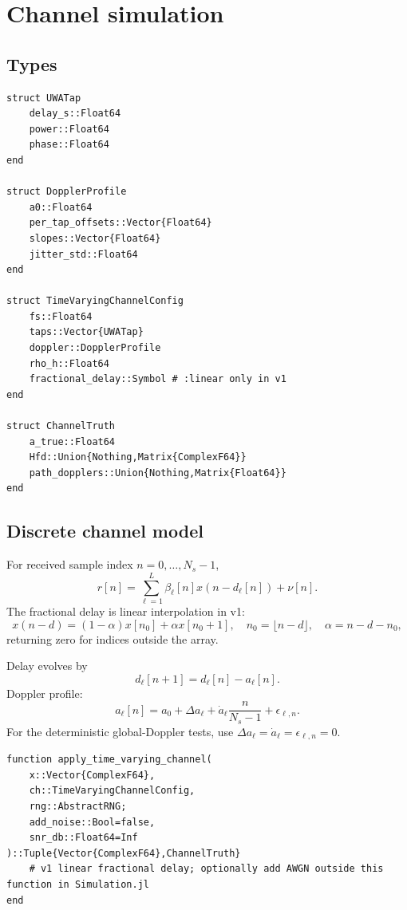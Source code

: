 \documentclass[11pt]{article}
\begin{document}
\clearpage
\section{Channel simulation}

\subsection{Types}

\begin{lstlisting}
struct UWATap
    delay_s::Float64
    power::Float64
    phase::Float64
end

struct DopplerProfile
    a0::Float64
    per_tap_offsets::Vector{Float64}
    slopes::Vector{Float64}
    jitter_std::Float64
end

struct TimeVaryingChannelConfig
    fs::Float64
    taps::Vector{UWATap}
    doppler::DopplerProfile
    rho_h::Float64
    fractional_delay::Symbol # :linear only in v1
end

struct ChannelTruth
    a_true::Float64
    Hfd::Union{Nothing,Matrix{ComplexF64}}
    path_dopplers::Union{Nothing,Matrix{Float64}}
end
\end{lstlisting}

\subsection{Discrete channel model}

For received sample index $n=0,\ldots,N_s-1$,
\begin{equation}
r[n]=\sum_{\ell=1}^{L}\beta_\ell[n]x(n-d_\ell[n])+\nu[n].
\end{equation}
The fractional delay is linear interpolation in v1:
\begin{equation}
x(n-d)=(1-\alpha)x[n_0]+\alpha x[n_0+1],\quad n_0=\lfloor n-d\rfloor,
\quad \alpha=n-d-n_0,
\end{equation}
returning zero for indices outside the array.

Delay evolves by
\begin{equation}
d_\ell[n+1]=d_\ell[n]-a_\ell[n].
\end{equation}
Doppler profile:
\begin{equation}
a_\ell[n]=a_0+\Delta a_\ell+\dot a_\ell\frac{n}{N_s-1}+\epsilon_{\ell,n}.
\end{equation}
For the deterministic global-Doppler tests, use $\Delta a_\ell=\dot a_\ell=\epsilon_{\ell,n}=0$.

\begin{lstlisting}
function apply_time_varying_channel(
    x::Vector{ComplexF64},
    ch::TimeVaryingChannelConfig,
    rng::AbstractRNG;
    add_noise::Bool=false,
    snr_db::Float64=Inf
)::Tuple{Vector{ComplexF64},ChannelTruth}
    # v1 linear fractional delay; optionally add AWGN outside this function in Simulation.jl
end
\end{lstlisting}
\end{document}
